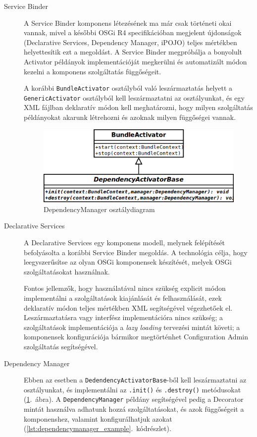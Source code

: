 \begin{description}
	\item[Service Binder] A Service Binder komponens létezésének ma már csak történeti okai vannak, mivel a későbbi OSGi R4 specifikációban megjelent újdonságok (Declarative Services, Dependency Manager, iPOJO) teljes mértékben helyettesítik ezt a megoldást. A Service Binder megpróbálja a bonyolult Activator példányok implementációját megkerülni és automatizált módon kezelni a komponens szolgáltatás függőségeit.
	
	A korábbi \texttt{BundleActivator} osztályból való leszármaztatás helyett a \texttt{GenericActivator} osztályból kell leszármaztatni az osztályunkat, és egy XML fájlban deklaratív módon kell meghatározni, hogy milyen szolgáltatás példányokat akarunk létrehozni és azoknak milyen függőségei vannak.
	
\begin{figure}[htp]
\centering
\includegraphics[scale=0.6]{img/class_dependencymanager}
\caption{DependencyManager osztálydiagram}
\label{fig:class_dependencymanager}
\end{figure}

	\item[Declarative Services] A Declarative Services egy komponens modell, melynek felépítését befolyásolta a korábbi Service Binder megoldás. A technológia célja, hogy leegyszerűsítse az olyan OSGi komponensek készítését, melyek OSGi szolgáltatásokat használnak.
	
	Fontos jellemzők, hogy használatával nincs szükség explicit módon implementálni a szolgáltatások kiajánlását és felhasználását, ezek deklaratív módon teljes mértékben XML segítségével végezhetőek el. Leszármaztatásra vagy interfész implementációra nincs szükség; a szolgáltatások implementációja a \textit{lazy loading} tervezési mintát követi; a komponensek konfigurációja bármikor megtörténhet Configuration Admin szolgáltatás segítségével.
	
	\item[Dependency Manager] Ebben az esetben a \texttt{DedendencyActivatorBase}-ből kell leszármaztatni az osztályunkat, és implementálni az \texttt{.init()} és \texttt{.destroy()} metódusokat (\ref{fig:class_dependencymanager}.~ábra). A \texttt{DependencyManager} példány segítségével pedig a Decorator mintát használva adhatunk hozzá szolgáltatásokat, és azok függőségeit a komponenshez, valamint konfigurálhatjuk azokat (\ref{lst:dependencymanager_example}.~kódrészlet).


\end{description}
